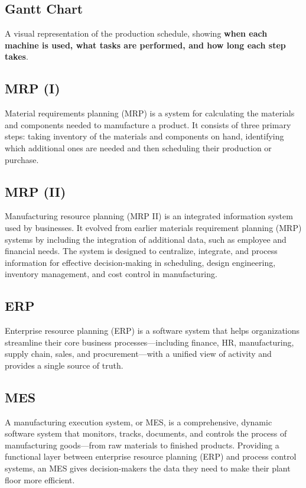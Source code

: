 \subsection{Gantt Chart}
A visual representation of the production schedule, showing \textbf{when each machine is used, what tasks are performed, and how long each step takes}.

\subsection{MRP (I)} Material requirements planning (MRP) is a system for calculating the materials and components needed to manufacture a product. It consists of three primary steps: taking inventory of the materials and components on hand, identifying which additional ones are needed and then scheduling their production or purchase. \cite{techtarget_mrp}

\subsection{MRP (II)} Manufacturing resource planning (MRP II) is an integrated information system used by businesses. It evolved from earlier materials requirement planning (MRP) systems by including the integration of additional data, such as employee and financial needs. The system is designed to centralize, integrate, and process information for effective decision-making in scheduling, design engineering, inventory management, and cost control in manufacturing. \cite{investopedia_mrpii}

\subsection{ERP} Enterprise resource planning (ERP) is a software system that helps organizations streamline their core business processes—including finance, HR, manufacturing, supply chain, sales, and procurement—with a unified view of activity and provides a single source of truth. \cite{sap_erp}

\subsection{MES} A manufacturing execution system, or MES, is a comprehensive, dynamic software system that monitors, tracks, documents, and controls the process of manufacturing goods—from raw materials to finished products. Providing a functional layer between enterprise resource planning (ERP) and process control systems, an MES gives decision-makers the data they need to make their plant floor more efficient. \cite{sap_mes}